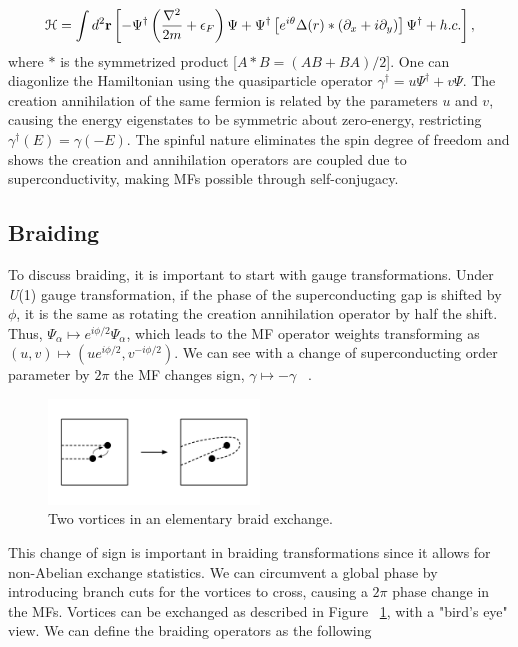 \begin{equation}
  \mathcal{H} = \int d^2 \mathbf{r} \left[ -\Psi^{\dagger} \left( \dfrac{\nabla^2}{2m} + \epsilon_F \right) \Psi + \Psi^{\dagger} \left[ e^{i\theta} \Delta(r) * \left( \partial_x +i\partial_y \right) \right] \Psi^{\dagger} + h.c. \right],
\end{equation}
where $*$ is the symmetrized product
[$A*B = (AB + BA) / 2$].
One can diagonlize the Hamiltonian using the quasiparticle operator
$\gamma^{\dagger} = u\Psi^{\dagger} + v\Psi$.
The creation annihilation of the same fermion is related by the parameters $u$ and $v$, causing the energy eigenstates to be symmetric about zero-energy, restricting
$\gamma^{\dagger}(E) = \gamma (-E)$.
The spinful nature eliminates the spin degree of freedom and shows the creation and annihilation operators are coupled due to superconductivity, making MFs possible through self-conjugacy.

\subsection{Braiding}
To discuss braiding, it is important to start with gauge transformations.
Under \textit{U}(1) gauge transformation, if the phase of the superconducting gap is shifted by $\phi$, it is the same as rotating the creation annihilation operator by half the shift.
Thus, $\Psi_{\alpha} \mapsto e^{i\phi/2} \Psi_{\alpha}$, which leads to the MF operator weights transforming as $(u,v) \mapsto (ue^{i\phi/2}, v^{-i\phi/2})$.
We can see with a change of superconducting order parameter by $2\pi$ the MF changes sign, $\gamma \mapsto -\gamma$ ~\cite{ivanovNonAbelianStatisticsHalfQuantum2001}.

\begin{figure}
  \includegraphics[width=0.5\textwidth]{./figures/pwave-braid.pdf}
  \caption{Two vortices in an elementary braid exchange.}
  \label{fig:pwave-braid}
\end{figure}


This change of sign is important in braiding transformations since it allows for non-Abelian exchange statistics.
We can circumvent a global phase by introducing branch cuts for the vortices to cross, causing a $2\pi$ phase change in the MFs.
Vortices can be exchanged as described in Figure ~\ref{fig:pwave-braid}, with a "bird's eye" view.
We can define the braiding operators as the following

